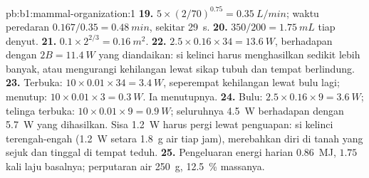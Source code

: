\begin{solution}{pb:b1:mammal-organization:1}
\textbf{19.} $5\times(2/70)^{0.75} = \qty{0.35}{L/min}$; waktu peredaran
$0.167/0.35 = \qty{0.48}{min}$, sekitar \qty{29}{s}.
\textbf{20.} $350/200 = \qty{1.75}{mL}$ tiap denyut.
\textbf{21.} $0.1\times 2^{2/3} = \qty{0.16}{m^2}$.
\textbf{22.} $2.5\times 0.16\times 34 = \qty{13.6}{W}$, berhadapan
dengan $2B = \qty{11.4}{W}$ yang diandaikan: si kelinci harus
menghasilkan sedikit lebih banyak, atau mengurangi kehilangan lewat
sikap tubuh dan tempat berlindung.
\textbf{23.} Terbuka: $10\times 0.01\times 34 = \qty{3.4}{W}$,
seperempat kehilangan lewat bulu lagi; menutup: $10\times 0.01\times 3 =
\qty{0.3}{W}$. Ia menutupnya.
\textbf{24.} Bulu: $2.5\times 0.16\times 9 = \qty{3.6}{W}$; telinga
terbuka: $10\times 0.01\times 9 = \qty{0.9}{W}$; seluruhnya \qty{4.5}{W}
berhadapan dengan \qty{5.7}{W} yang dihasilkan. Sisa \qty{1.2}{W} harus
pergi lewat penguapan: si kelinci terengah-engah (\qty{1.2}{W} setara
\qty{1.8}{g} air tiap jam), merebahkan diri di tanah yang sejuk dan
tinggal di tempat teduh.
\textbf{25.} Pengeluaran energi harian \qty{0.86}{MJ}, $1.75$ kali laju
basalnya; perputaran air \qty{250}{g}, \qty{12.5}{\%} massanya.
\end{solution}
